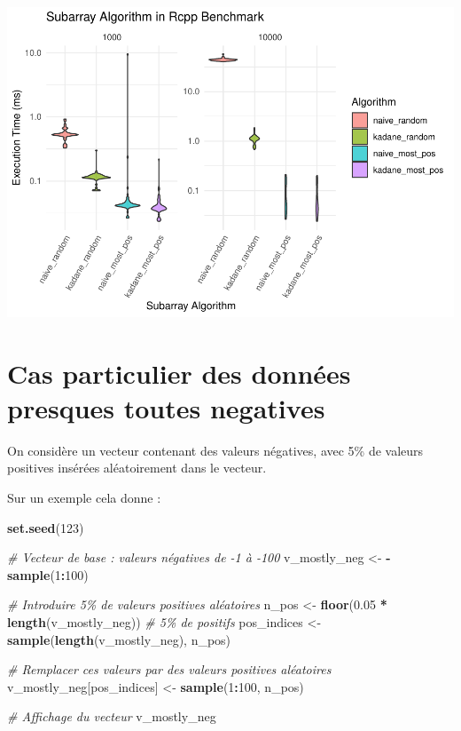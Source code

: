 \documentclass[
]{article}
\newenvironment{Shaded}{\begin{snugshade}}{\end{snugshade}}
\newcommand{\CommentTok}[1]{\textcolor[rgb]{0.56,0.35,0.01}{\textit{#1}}}
\newcommand{\DecValTok}[1]{\textcolor[rgb]{0.00,0.00,0.81}{#1}}
\newcommand{\FloatTok}[1]{\textcolor[rgb]{0.00,0.00,0.81}{#1}}
\newcommand{\FunctionTok}[1]{\textcolor[rgb]{0.13,0.29,0.53}{\textbf{#1}}}
\newcommand{\NormalTok}[1]{#1}
\newcommand{\OtherTok}[1]{\textcolor[rgb]{0.56,0.35,0.01}{#1}}
\newcommand{\SpecialCharTok}[1]{\textcolor[rgb]{0.81,0.36,0.00}{\textbf{#1}}}
\begin{document}
\includegraphics{MaxSubarray1D_files/figure-latex/benchmark3-1.pdf}

\section{Cas particulier des données presques toutes
negatives}\label{cas-particulier-des-donnuxe9es-presques-toutes-negatives}

On considère un vecteur contenant des valeurs négatives, avec 5\% de
valeurs positives insérées aléatoirement dans le vecteur.

Sur un exemple cela donne :

\begin{Shaded}
\begin{Highlighting}[]
\FunctionTok{set.seed}\NormalTok{(}\DecValTok{123}\NormalTok{)}

\CommentTok{\# Vecteur de base : valeurs négatives de {-}1 à {-}100}
\NormalTok{v\_mostly\_neg }\OtherTok{\textless{}{-}} \SpecialCharTok{{-}}\FunctionTok{sample}\NormalTok{(}\DecValTok{1}\SpecialCharTok{:}\DecValTok{100}\NormalTok{)}

\CommentTok{\# Introduire 5\% de valeurs positives aléatoires}
\NormalTok{n\_pos }\OtherTok{\textless{}{-}} \FunctionTok{floor}\NormalTok{(}\FloatTok{0.05} \SpecialCharTok{*} \FunctionTok{length}\NormalTok{(v\_mostly\_neg))  }\CommentTok{\# 5\% de positifs}
\NormalTok{pos\_indices }\OtherTok{\textless{}{-}} \FunctionTok{sample}\NormalTok{(}\FunctionTok{length}\NormalTok{(v\_mostly\_neg), n\_pos)}

\CommentTok{\# Remplacer ces valeurs par des valeurs positives aléatoires}
\NormalTok{v\_mostly\_neg[pos\_indices] }\OtherTok{\textless{}{-}} \FunctionTok{sample}\NormalTok{(}\DecValTok{1}\SpecialCharTok{:}\DecValTok{100}\NormalTok{, n\_pos)}

\CommentTok{\# Affichage du vecteur}
\NormalTok{v\_mostly\_neg}
\end{Highlighting}
\end{Shaded}
\end{document}

